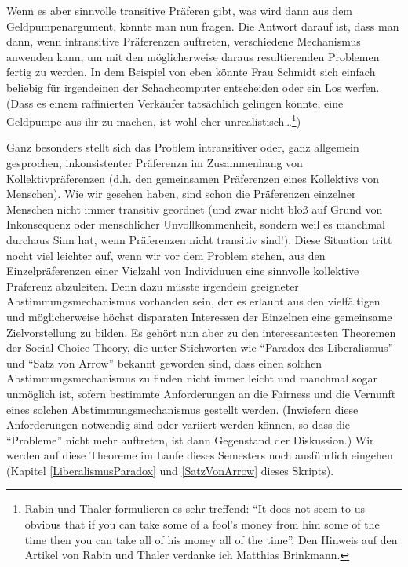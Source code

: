 Wenn es aber sinnvolle transitive Präferen gibt, was wird dann aus dem
Geldpumpenargument, könnte man nun fragen. Die Antwort darauf ist, dass man dann,
wenn intransitive Präferenzen auftreten, verschiedene Mechanismus anwenden kann,
um mit den möglicherweise daraus resultierenden Problemen fertig zu werden. In
dem Beispiel von eben könnte Frau Schmidt sich einfach beliebig für irgendeinen
der Schachcomputer entscheiden oder ein Los werfen. (Dass es einem raffinierten
Verkäufer tatsächlich gelingen könnte, eine Geldpumpe aus ihr zu machen, ist
wohl eher unrealistisch\ldots\footnote{Rabin und Thaler formulieren es sehr treffend:
"`It does not seem to us obvious that if you can take some of a fool’s money from
him some of the time then you can take all of his money all of the
time"'.\cite[S. 227]{rabin-thaler:2001} Den Hinweis auf den Artikel von Rabin und
Thaler verdanke ich Matthias Brinkmann.})

Ganz besonders stellt sich das Problem intransitiver oder, ganz allgemein
gesprochen, inkonsistenter Präferenzn im Zusammenhang von Kollektivpräferenzen
(d.h. den gemeinsamen Präferenzen eines Kollektivs von Menschen). Wie wir gesehen
haben, sind schon die Präferenzen einzelner Menschen nicht immer transitiv
geordnet (und zwar nicht bloß auf Grund von Inkonsequenz oder menschlicher
Unvollkommenheit, sondern weil es manchmal durchaus Sinn hat, wenn Präferenzen
nicht transitiv sind!). Diese Situation tritt nocht viel leichter auf, wenn wir
vor dem Problem stehen, aus den Einzelpräferenzen einer Vielzahl von Individuuen
eine sinnvolle kollektive Präferenz abzuleiten. Denn dazu müsste irgendein
geeigneter Abstimmungsmechanismus vorhanden sein, der es erlaubt aus den
vielfältigen und möglicherweise höchst disparaten Interessen der Einzelnen eine
gemeinsame Zielvorstellung zu bilden. Es gehört nun aber zu den interessantesten
Theoremen der Social-Choice Theory, die unter Stichworten wie "`Paradox des
Liberalismus"' und "`Satz von Arrow"' bekannt geworden sind, dass einen solchen
Abstimmungsmechanismus zu finden nicht immer leicht und manchmal sogar unmöglich
ist, sofern bestimmte Anforderungen an die Fairness und die Vernunft eines
solchen Abstimmungsmechanismus gestellt werden. (Inwiefern diese Anforderungen
notwendig sind oder variiert werden können, so dass die "`Probleme"' nicht mehr
auftreten, ist dann Gegenstand der Diskussion.) Wir werden auf diese Theoreme im
Laufe dieses Semesters noch ausführlich eingehen (Kapitel
\ref{LiberalismusParadox} und \ref{SatzVonArrow} dieses Skripts).
 
